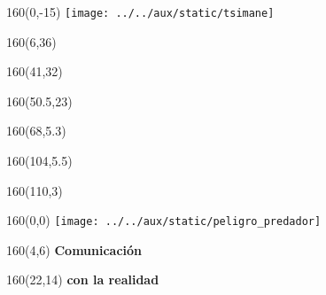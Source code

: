 \documentclass[shownotes,aspectratio=169]{beamer}
\begin{document}
\begin{frame}

\begin{textblock}{160}(0,-15)
\texttt{[image: ../../aux/static/tsimane]}
\end{textblock}


\begin{textblock}{160}(6,36)
\LARGE {}
\end{textblock}
\begin{textblock}{160}(41,32)
\LARGE {}
\end{textblock}
\begin{textblock}{160}(50.5,23)
\LARGE {}
\end{textblock}
\begin{textblock}{160}(68,5.3)
\LARGE {}
\end{textblock}
\begin{textblock}{160}(104,5.5)
\LARGE {}
\end{textblock}
\begin{textblock}{160}(110,3)
\LARGE {}
\end{textblock}

\end{frame}

\begin{frame}

\begin{textblock}{160}(0,0)
\texttt{[image: ../../aux/static/peligro\_predador]}
\end{textblock}

\begin{textblock}{160}(4,6)
\LARGE \textcolor{black!75}{\fontsize{22}{0}\selectfont \textbf{Comunicación}}
\end{textblock}
\begin{textblock}{160}(22,14)
\LARGE \textcolor{black!75}{\fontsize{22}{0}\selectfont \textbf{con la realidad}}
\end{textblock}


\end{frame}
\end{document}
